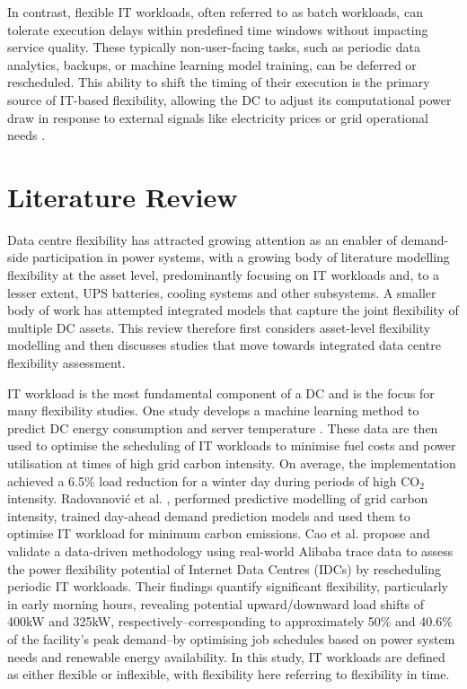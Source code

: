 \documentclass[lettersize,journal]{IEEEtran}
\newcommand{\rev}[1]{\textcolor{blue!70!black}{#1}}
\begin{document}
In contrast, flexible IT workloads, often referred to as batch workloads, can tolerate execution delays within predefined time windows without impacting service quality. These typically non-user-facing tasks, such as periodic data analytics, backups, or machine learning model training, can be deferred or rescheduled. This ability to shift the timing of their execution is the primary source of IT-based flexibility, allowing the DC to adjust its computational power draw in response to external signals like electricity prices or grid operational needs \cite{Cao2022ApEn}.

\section{Literature Review}

\rev{Data centre flexibility has attracted growing attention as an enabler of demand-side participation in power systems, with a growing body of literature modelling flexibility at the asset level, predominantly focusing on IT workloads and, to a lesser extent, UPS batteries, cooling systems and other subsystems. A smaller body of work has attempted integrated models that capture the joint flexibility of multiple DC assets. This review therefore first considers asset-level flexibility modelling and then discusses studies that move towards integrated data centre flexibility assessment.}

IT workload is the most fundamental component of a DC and is the focus for many flexibility studies. One study develops a machine learning method to predict DC energy consumption and server temperature \cite{misaghian2022assessment}. These data are then used to optimise the scheduling of IT workloads to minimise fuel costs and power utilisation at times of high grid carbon intensity. On average, the implementation achieved a 6.5\% load reduction for a winter day during periods of high CO$_2$ intensity. Radovanovi\'c et al. \cite{radovanovic2022carbon}, performed predictive modelling of grid carbon intensity, trained day-ahead demand prediction models and used them to optimise IT workload for minimum carbon emissions.
Cao et al. \cite{cao2022data} propose and validate a data-driven methodology using real-world Alibaba trace data to assess the power flexibility potential of Internet Data Centres (IDCs) by rescheduling periodic IT workloads. Their findings quantify significant flexibility, particularly in early morning hours, revealing potential upward/downward load shifts of 400kW and 325kW, respectively--corresponding to approximately 50\% and 40.6\% of the facility's peak demand--by optimising job schedules based on power system needs and renewable energy availability. In this study, IT workloads are defined as either flexible or inflexible, with flexibility here referring to flexibility in time.
\end{document}
